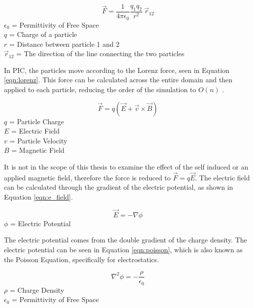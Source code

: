 \begin{equation}
    \label{eqn:coulmb}
    \vec{F} = \frac{1}{4 \pi \epsilon_0} \frac{q_1 q_2}{r^2}  \: \vec{r}_{12}
\end{equation}
\(\epsilon_0\) = Permittivity of Free Space \\
\(q\) = Charge of a particle \\
\(r\) = Distance between particle 1 and 2 \\
\(\vec{r}_{12}\) = The direction of the line connecting the two particles \par

\indent In PIC, the particles move according to the Lorenz force, seen in Equation \ref{eqn:lorenz}. This force can be calculated across the entire domain and then applied to each particle, reducing the order of the simulation to \(O(n)\) \cite{es-pic}. \par

\begin{equation}
    \label{eqn:lorenz}
    \vec{F} = q (\vec{E} + \vec{v}  \times \vec{B})
\end{equation}
\(q\) = Particle Charge \\
\(E\) = Electric Field \\
\(v\) = Particle Velocity \\
\(B\) = Magnetic Field \par

\indent It is not in the scope of this thesis to examine the effect of the self induced or an applied magnetic field, therefore the force is reduced to \(\vec{F} = q \vec{E}\). The electric field can be calculated through the gradient of the electric potential, as shown in Equation \ref{eqn:e_field}. \par


\begin{equation}
    \label{eqn:e_field}
    \vec{E} = - \nabla \phi
\end{equation}
\(\phi\) = Electric Potential \par

\indent The electric potential comes from the double gradient of the charge density. The electric potential can be seen in Equation \ref{eqn:poisson}, which is also known as the Poisson Equation, specifically for electrostatics. \par

\begin{equation}
    \label{eqn:poisson}
    \nabla^2 \phi = - \frac{\rho}{\epsilon_0}
\end{equation}
\(\rho\) = Charge Density \\
\(\epsilon_0\) = Permittivity of Free Space \par

